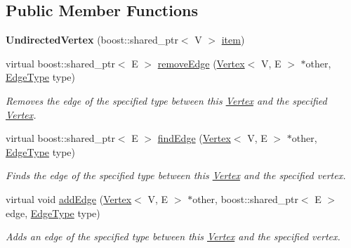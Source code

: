 \subsection*{Public Member Functions}
\begin{DoxyCompactItemize}
\item 
\hypertarget{classrepast_1_1_undirected_vertex_a20743a1b920e40b9b56fcdbfb68de044}{{\bfseries Undirected\-Vertex} (boost\-::shared\-\_\-ptr$<$ V $>$ \hyperlink{classrepast_1_1_vertex_a55749dbe0d9f79bb39dfea7733070305}{item})}\label{classrepast_1_1_undirected_vertex_a20743a1b920e40b9b56fcdbfb68de044}

\item 
virtual boost\-::shared\-\_\-ptr$<$ E $>$ \hyperlink{classrepast_1_1_undirected_vertex_a7e6c99d00630df8ddcf416024d907766}{remove\-Edge} (\hyperlink{classrepast_1_1_vertex}{Vertex}$<$ V, E $>$ $\ast$other, \hyperlink{classrepast_1_1_vertex_a8b4819d648c7c0dd8b0622beea77cc14}{Edge\-Type} type)
\begin{DoxyCompactList}\small\item\em Removes the edge of the specified type between this \hyperlink{classrepast_1_1_vertex}{Vertex} and the specified \hyperlink{classrepast_1_1_vertex}{Vertex}. \end{DoxyCompactList}\item 
virtual boost\-::shared\-\_\-ptr$<$ E $>$ \hyperlink{classrepast_1_1_undirected_vertex_aa0ec238951147d6ae9677375af54c740}{find\-Edge} (\hyperlink{classrepast_1_1_vertex}{Vertex}$<$ V, E $>$ $\ast$other, \hyperlink{classrepast_1_1_vertex_a8b4819d648c7c0dd8b0622beea77cc14}{Edge\-Type} type)
\begin{DoxyCompactList}\small\item\em Finds the edge of the specified type between this \hyperlink{classrepast_1_1_vertex}{Vertex} and the specified vertex. \end{DoxyCompactList}\item 
virtual void \hyperlink{classrepast_1_1_undirected_vertex_a8c7f13540d90e05a5e3f2f9d1a8b5c08}{add\-Edge} (\hyperlink{classrepast_1_1_vertex}{Vertex}$<$ V, E $>$ $\ast$other, boost\-::shared\-\_\-ptr$<$ E $>$ edge, \hyperlink{classrepast_1_1_vertex_a8b4819d648c7c0dd8b0622beea77cc14}{Edge\-Type} type)
\begin{DoxyCompactList}\small\item\em Adds an edge of the specified type between this \hyperlink{classrepast_1_1_vertex}{Vertex} and the specified vertex. \end{DoxyCompactList}\item 

\end{DoxyCompactItemize}
